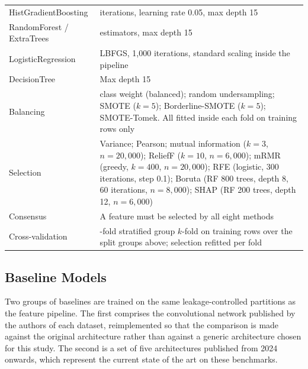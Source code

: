 \begin{table}[!htbp]
\begin{tabularx}{\textwidth}{@{}>{\raggedright\arraybackslash}p{3.0cm} >{\raggedright\arraybackslash}X@{}}
		HistGradientBoosting & 500 iterations, learning rate 0.05, max depth 15\\
		RandomForest / ExtraTrees & 300 estimators, max depth 15\\
		LogisticRegression & LBFGS, 1{,}000 iterations, standard scaling inside the pipeline\\
		DecisionTree & Max depth 15\\
		Balancing & class weight (balanced); random undersampling; SMOTE ($k = 5$); Borderline-SMOTE ($k = 5$); SMOTE-Tomek. All fitted inside each fold on training rows only\\
		Selection & Variance; Pearson; mutual information ($k = 3$, $n = 20{,}000$); ReliefF ($k = 10$, $n = 6{,}000$); mRMR (greedy, $k = 400$, $n = 20{,}000$); RFE (logistic, 300 iterations, step 0.1); Boruta (RF 800 trees, depth 8, 60 iterations, $n = 8{,}000$); SHAP (RF 200 trees, depth 12, $n = 6{,}000$)\\
		Consensus & A feature must be selected by all eight methods\\
		Cross-validation & 5-fold stratified group $k$-fold on training rows over the split groups above; selection refitted per fold\\
		\bottomrule
	\end{tabularx}
\end{table}

\subsection{Baseline Models}
\label{sec:chap3Baselines}
Two groups of baselines are trained on the same leakage-controlled partitions as the feature pipeline. The first comprises the convolutional network published by the authors of each dataset, reimplemented so that the comparison is made against the original architecture rather than against a generic architecture chosen for this study. The second is a set of five architectures published from 2024 onwards, which represent the current state of the art on these benchmarks.

